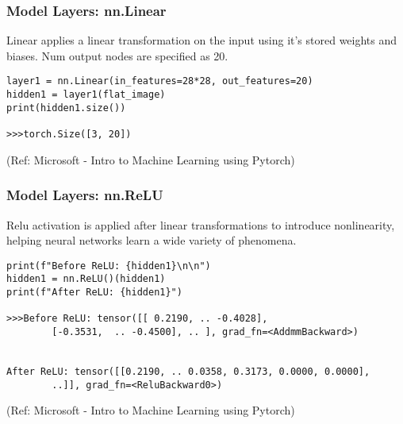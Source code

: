 \begin{frame}[fragile] \frametitle{Model Layers: nn.Linear}

Linear applies a linear transformation on the input using it's stored weights and biases. Num output nodes are specified as 20.

\begin{lstlisting}
layer1 = nn.Linear(in_features=28*28, out_features=20)
hidden1 = layer1(flat_image)
print(hidden1.size())

>>>torch.Size([3, 20])
\end{lstlisting}

\tiny{(Ref: Microsoft - Intro to Machine Learning using Pytorch)}
\end{frame}

\begin{frame}[fragile] \frametitle{Model Layers: nn.ReLU}

Relu activation is applied after linear transformations to introduce nonlinearity, helping neural networks learn a wide variety of phenomena.

\begin{lstlisting}
print(f"Before ReLU: {hidden1}\n\n")
hidden1 = nn.ReLU()(hidden1)
print(f"After ReLU: {hidden1}")

>>>Before ReLU: tensor([[ 0.2190, .. -0.4028],
        [-0.3531,  .. -0.4500], .. ], grad_fn=<AddmmBackward>)


After ReLU: tensor([[0.2190, .. 0.0358, 0.3173, 0.0000, 0.0000],
        ..]], grad_fn=<ReluBackward0>)

\end{lstlisting}

\tiny{(Ref: Microsoft - Intro to Machine Learning using Pytorch)}
\end{frame}

